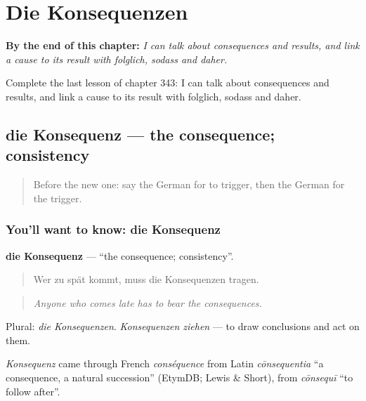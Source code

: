 
\chapter{Die Konsequenzen}
\label{ch:ge-die-konsequenzen}

\begin{chapteropening}
\textbf{By the end of this chapter:} \emph{I can talk about consequences and results, and link a cause to its result with folglich, sodass and daher.}

Complete the last lesson of chapter 343: I can talk about consequences and results, and link a cause to its result with folglich, sodass and daher.
\end{chapteropening}

\section[die Konsequenz]{die Konsequenz — the consequence; consistency}

\label{lesson:GE-C343-konsequenz}



\begin{quote}
Before the new one: say the German for to trigger, then the German for the trigger.
\end{quote}

\subsection*{You'll want to know: die Konsequenz}
\textbf{die Konsequenz} — \textquotedblleft{}the consequence; consistency\textquotedblright{}.

\begin{quote}
Wer zu spät kommt, muss die Konsequenzen tragen.
\end{quote}

\begin{quote}
\emph{Anyone who comes late has to bear the consequences.}
\end{quote}

Plural: \emph{die Konsequenzen}. \emph{Konsequenzen ziehen} — to draw conclusions and act on them.

\begin{cousinweb}
\emph{Konsequenz} came through French \emph{conséquence} from Latin \emph{cōnsequentia} \textquotedblleft{}a consequence, a natural succession\textquotedblright{} (EtymDB; Lewis \& Short), from \emph{cōnsequī} \textquotedblleft{}to follow after\textquotedblright{}.
\end{cousinweb}

